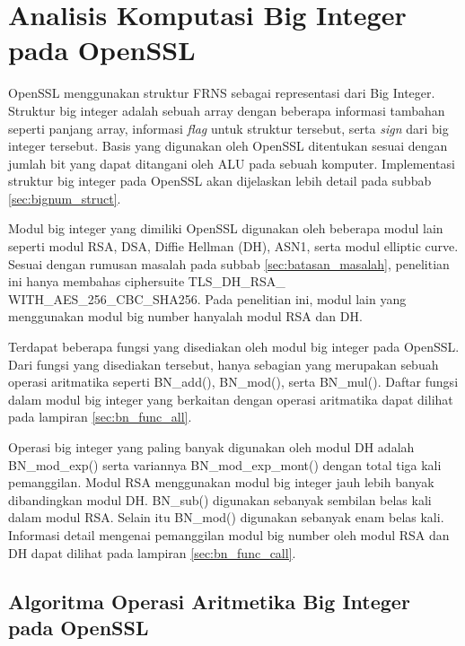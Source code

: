\section{Analisis Komputasi Big Integer pada OpenSSL}


  OpenSSL menggunakan struktur FRNS sebagai representasi dari Big Integer. Struktur big integer adalah sebuah array dengan beberapa informasi tambahan seperti panjang array, informasi \textit{flag} untuk struktur tersebut, serta \textit{sign} dari big integer tersebut. Basis yang digunakan oleh OpenSSL ditentukan sesuai dengan jumlah bit yang dapat ditangani oleh ALU pada sebuah komputer. Implementasi struktur big integer pada OpenSSL akan dijelaskan lebih detail pada subbab \ref{sec:bignum_struct}.

  Modul big integer yang dimiliki OpenSSL digunakan oleh beberapa modul lain seperti modul RSA, DSA, Diffie Hellman (DH), ASN1, serta modul elliptic curve. Sesuai dengan rumusan masalah pada subbab \ref{sec:batasan_masalah}, penelitian ini hanya membahas ciphersuite TLS\_DH\_RSA\_ WITH\_AES\_256\_CBC\_SHA256. Pada penelitian ini, modul lain yang menggunakan modul big number hanyalah modul RSA dan DH.

  Terdapat beberapa fungsi yang disediakan oleh modul big integer pada OpenSSL. Dari fungsi yang disediakan tersebut, hanya sebagian yang merupakan sebuah operasi aritmatika seperti BN\_add(), BN\_mod(), serta BN\_mul(). Daftar fungsi dalam modul big integer yang berkaitan dengan operasi aritmatika dapat dilihat pada lampiran \ref{sec:bn_func_all}.

  Operasi big integer yang paling banyak digunakan oleh modul DH adalah BN\_mod\_exp() serta variannya BN\_mod\_exp\_mont() dengan total tiga kali pemanggilan. Modul RSA menggunakan modul big integer jauh lebih banyak dibandingkan modul DH. BN\_sub() digunakan sebanyak sembilan belas kali dalam modul RSA. Selain itu BN\_mod() digunakan sebanyak enam belas kali. Informasi detail mengenai pemanggilan modul big number oleh modul RSA dan DH dapat dilihat pada lampiran \ref{sec:bn_func_call}.

  \subsection{Algoritma Operasi Aritmetika Big Integer pada OpenSSL}

